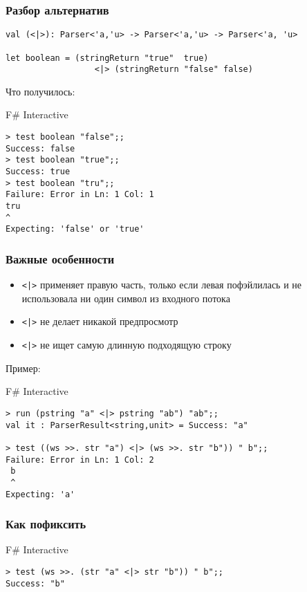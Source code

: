 \documentclass[xetex,mathserif,serif]{beamer}
\begin{document}
    \begin{frame}[fragile]
        \frametitle{Разбор альтернатив}
        \begin{small}
            \begin{verbatim}
val (<|>): Parser<'a,'u> -> Parser<'a,'u> -> Parser<'a, 'u>

let boolean = (stringReturn "true"  true)
                  <|> (stringReturn "false" false)
            \end{verbatim}
            Что получилось:
            \begin{alertblock}{F\# Interactive}
                \begin{verbatim}
> test boolean "false";;
Success: false
> test boolean "true";;
Success: true
> test boolean "tru";;
Failure: Error in Ln: 1 Col: 1
tru
^
Expecting: 'false' or 'true'
                \end{verbatim}
            \end{alertblock}
        \end{small}
    \end{frame}

    \begin{frame}[fragile]
        \frametitle{Важные особенности}
        \begin{small}
            \begin{itemize}
                \item \verb!<|>! применяет правую часть, только если левая пофэйлилась и не использовала ни один символ из входного потока
                \item \verb!<|>! не делает никакой предпросмотр
                \item \verb!<|>! не ищет самую длинную подходящую строку
            \end{itemize}
            Пример:
            \begin{alertblock}{F\# Interactive}
                \begin{verbatim}
> run (pstring "a" <|> pstring "ab") "ab";;
val it : ParserResult<string,unit> = Success: "a"

> test ((ws >>. str "a") <|> (ws >>. str "b")) " b";;
Failure: Error in Ln: 1 Col: 2
 b
 ^
Expecting: 'a'
                \end{verbatim}
            \end{alertblock}
        \end{small}
    \end{frame}

    \begin{frame}[fragile]
        \frametitle{Как пофиксить}
        \begin{alertblock}{F\# Interactive}
            \begin{verbatim}
> test (ws >>. (str "a" <|> str "b")) " b";;
Success: "b"
            \end{verbatim}
        \end{alertblock}
    \end{frame}
\end{document}

